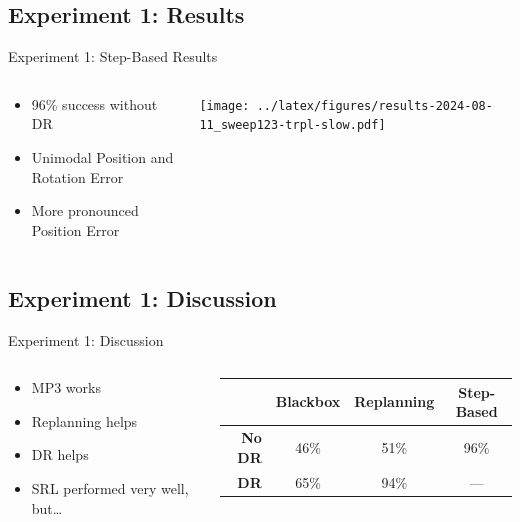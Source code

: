 \documentclass[16:9,en,navbarinfooter]{sdqbeamer}
\begin{document}
\subsection{Experiment 1: Results}
\begin{frame}{Experiment 1: Step-Based Results}

	\begin{columns}[t]
		\begin{column}{0.3\textwidth}
			\vspace{1cm}
			\begin{itemize}
				\item 96\% success without DR
				\item Unimodal Position and Rotation Error
				\item More pronounced Position Error
			\end{itemize}
		\end{column}
		\begin{column}{0.7\textwidth}
			\vspace{1cm}
			\texttt{[image: ../latex/figures/results-2024-08-11\_sweep123-trpl-slow.pdf]}
		\end{column}
	\end{columns}
\end{frame}

\subsection{Experiment 1: Discussion}
\begin{frame}{Experiment 1: Discussion}

	\begin{columns}[t]
		\begin{column}{0.3\textwidth}
			\vspace{1em}
			\begin{itemize}
				\item MP3 works
				\item Replanning helps
				\item DR helps
				\item SRL performed very well, but\dots
			\end{itemize}
		\end{column}
		\begin{column}{0.7\textwidth}
			\vspace{1cm}
			\begin{center}

				\begin{tabular}{rccc}
					               & \textbf{Blackbox} & \textbf{Replanning} & \textbf{Step-Based} \\
					\toprule
					\textbf{No DR} & 46\%              & 51\%                & 96\%                \\
					\textbf{DR}    & 65\%              & 94\%                & ---
				\end{tabular}
			\end{center}
		\end{column}
	\end{columns}
\end{frame}
\end{document}
